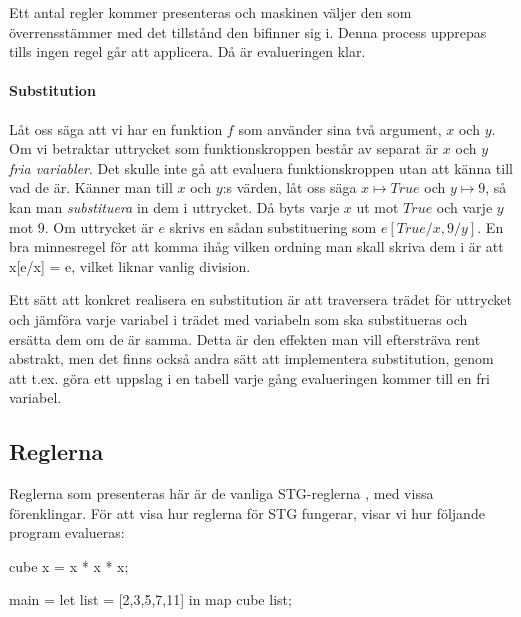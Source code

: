 \documentclass[../Core]{subfiles}
\begin{document}

Ett antal regler kommer presenteras och maskinen väljer den som överrensstämmer
med det tillstånd den bifinner sig i. Denna process upprepas
tills ingen regel går att applicera. Då är evalueringen klar.

\paragraph{Substitution}

Låt oss säga att vi har en funktion $f$ som använder sina två 
argument, $x$ och $y$. Om vi betraktar uttrycket som funktionskroppen består av separat är $x$ och $y$ 
\emph{fria variabler}. Det skulle inte gå att evaluera funktionskroppen utan
att känna till vad de är. Känner man till $x$ och $y$:s värden, låt oss säga
$x \mapsto True$ och $y \mapsto 9$, så kan man \emph{substituera} in dem i 
uttrycket. Då byts varje $x$ ut mot $True$ och varje $y$ mot $9$. Om uttrycket 
är $e$ skrivs en sådan substituering som $e[True/x, 9/y]$. 
  En bra minnesregel för att komma ihåg vilken ordning man skall 
  skriva dem i är att x[e/x] = e, vilket liknar vanlig division.

    Ett sätt att konkret realisera en substitution är att traversera trädet
för uttrycket och jämföra varje variabel i trädet med variabeln som ska 
substitueras och ersätta dem om de är samma. Detta är den effekten man vill 
eftersträva rent abstrakt, men det finns också andra sätt att implementera 
substitution, genom att t.ex. göra ett uppslag i en tabell varje gång 
evalueringen kommer till en fri variabel. 

\subsection{Reglerna}

Reglerna som presenteras här är de vanliga STG-reglerna \cite{marlow2006making},
med vissa förenklingar.
För att visa hur reglerna
för STG  fungerar, visar vi hur följande program evalueras:

\begin{codeEx}
cube x = x * x * x;

main = let list = [2,3,5,7,11]
       in  map cube list;
\end{codeEx}
\end{document}
